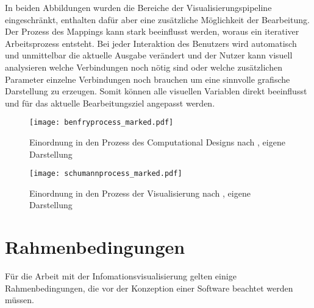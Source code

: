 \documentclass[a4paper, 12pt, DIVcalc, onepage, pdftex, headsepline, footsepline]{scrreprt}
\begin{document}
In beiden Abbildungen wurden die Bereiche der Visualisierungspipeline eingeschränkt, enthalten dafür aber
eine zusätzliche Möglichkeit der Bearbeitung.
Der Prozess des Mappings kann stark beeinflusst werden, woraus ein iterativer Arbeitsprozess entsteht.
Bei jeder Interaktion des Benutzers wird automatisch und unmittelbar die
aktuelle Ausgabe verändert und der Nutzer kann visuell analysieren welche Verbindungen noch nötig sind
oder welche zusätzlichen Parameter einzelne Verbindungen noch brauchen um eine sinnvolle grafische 
Darstellung zu erzeugen.
Somit können alle visuellen Variablen direkt beeinflusst und für das aktuelle Bearbeitungsziel angepasst
werden.
\begin{figure}
\centering
\texttt{[image: benfryprocess\_marked.pdf]}
\caption{Einordnung in den Prozess des Computational Designs nach \citep{BenFry}, eigene Darstellung}
\label{fig:benfryprocess_marked}
\end{figure}
\begin{figure}
\centering
\texttt{[image: schumannprocess\_marked.pdf]}
\caption{Einordnung in den Prozess der Visualisierung nach \citep{Schumann}, eigene Darstellung}
\label{fig:schumannprocess_marked}
\end{figure}

\section{Rahmenbedingungen}
Für die Arbeit mit der Infomationsvisualisierung gelten einige Rahmenbedingungen, die vor der
Konzeption einer Software beachtet werden müssen.
\end{document}
